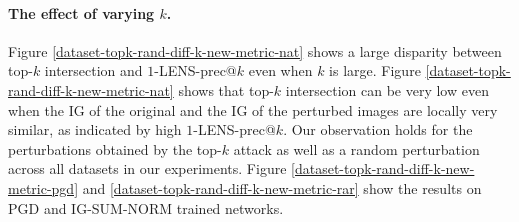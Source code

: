\documentclass[letterpaper]{article} %
\begin{document}
\paragraph{The effect of varying $k$.} Figure \ref{dataset-topk-rand-diff-k-new-metric-nat} shows a large disparity between top-$k$ intersection and $1$-LENS-prec@$k$ even when $k$ is large. Figure \ref{dataset-topk-rand-diff-k-new-metric-nat} shows that top-$k$ intersection can be very low even when the IG of the original and the IG of the perturbed images are locally very similar, as indicated by high $1$-LENS-prec@$k$. Our observation holds for the perturbations obtained by the top-$k$ attack \citep{ghorbani2018interpretation} as well as a random perturbation across all datasets in our experiments. Figure \ref{dataset-topk-rand-diff-k-new-metric-pgd} and \ref{dataset-topk-rand-diff-k-new-metric-rar} show the results on PGD and IG-SUM-NORM trained networks. 
\end{document}

